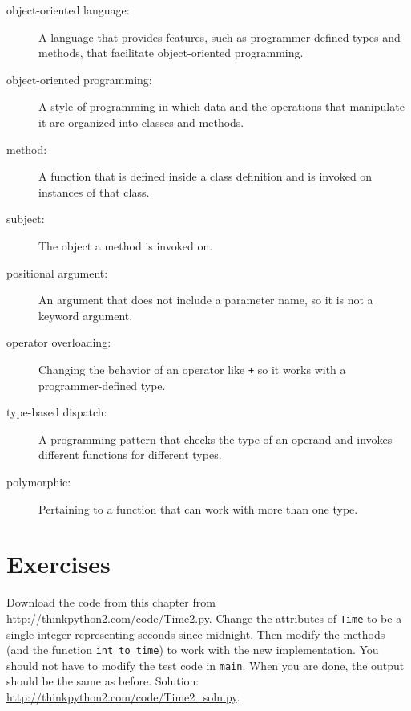 \documentclass[10pt]{book}
\begin{document}
\begin{description}

\item[object-oriented language:] A language that provides features,
  such as programmer-defined types and methods, that facilitate
  object-oriented programming.

\item[object-oriented programming:] A style of programming in which
data and the operations that manipulate it are organized into classes
and methods.

\item[method:] A function that is defined inside a class definition and
is invoked on instances of that class.

\item[subject:] The object a method is invoked on.

\item[positional argument:]  An argument that does not include
a parameter name, so it is not a keyword argument.

\item[operator overloading:] Changing the behavior of an operator like
{\tt +} so it works with a programmer-defined type.

\item[type-based dispatch:] A programming pattern that checks the type
of an operand and invokes different functions for different types.

\item[polymorphic:] Pertaining to a function that can work with more
  than one type.  

\end{description}


\section{Exercises}

\begin{exercise}

Download the code from this chapter from
\url{http://thinkpython2.com/code/Time2.py}.  Change the attributes of
    {\tt Time} to be a single integer representing seconds since
    midnight.  Then modify the methods (and the function
    \verb"int_to_time") to work with the new implementation.  You
    should not have to modify the test code in {\tt main}.  When you
    are done, the output should be the same as before.  Solution:
    \url{http://thinkpython2.com/code/Time2_soln.py}.

\end{exercise}
\end{document}
